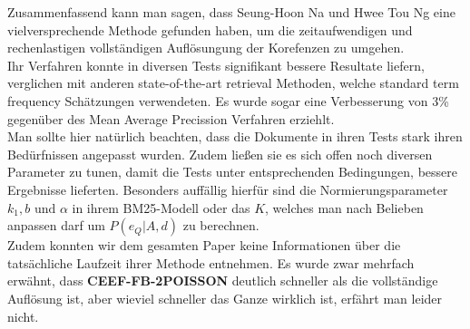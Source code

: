 Zusammenfassend kann man sagen, dass Seung-Hoon Na und Hwee Tou Ng eine vielversprechende Methode gefunden haben, um die zeitaufwendigen und rechenlastigen vollständigen Auflösungung der Korefenzen zu umgehen.\\
Ihr Verfahren konnte in diversen Tests signifikant bessere Resultate liefern, verglichen mit anderen state-of-the-art retrieval Methoden, welche standard term frequency Schätzungen verwendeten. Es wurde sogar eine Verbesserung von 3\% gegenüber des Mean Average Precission Verfahren erziehlt.\\
Man sollte hier natürlich beachten, dass die Dokumente in ihren Tests stark ihren Bedürfnissen angepasst wurden. Zudem ließen sie es sich offen noch diversen Parameter zu tunen, damit die Tests unter entsprechenden Bedingungen, bessere Ergebnisse lieferten. Besonders auffällig hierfür sind die Normierungsparameter $k_1, b \text{ und } \alpha$ in ihrem BM25-Modell oder das $K$, welches man nach Belieben anpassen darf um $P(e_Q| A,d)$ zu berechnen.\\
Zudem konnten wir dem gesamten Paper keine Informationen über die tatsächliche Laufzeit ihrer Methode entnehmen. Es wurde zwar mehrfach erwähnt, dass \textbf{CEEF-FB-2POISSON} deutlich schneller als die vollständige Auflösung ist, aber wieviel schneller das Ganze wirklich ist, erfährt man leider nicht.\\

